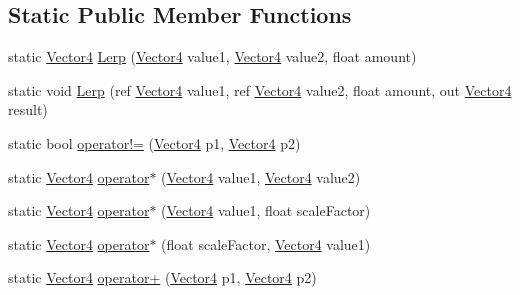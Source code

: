 \subsection*{Static Public Member Functions}
\begin{DoxyCompactItemize}
\item 
static \hyperlink{structMicrosoft_1_1Xna_1_1Framework_1_1Vector4}{Vector4} \hyperlink{structMicrosoft_1_1Xna_1_1Framework_1_1Vector4_a5174b43ecf230828b315f27f7b83b7c8}{Lerp} (\hyperlink{structMicrosoft_1_1Xna_1_1Framework_1_1Vector4}{Vector4} value1, \hyperlink{structMicrosoft_1_1Xna_1_1Framework_1_1Vector4}{Vector4} value2, float amount)
\item 
static void \hyperlink{structMicrosoft_1_1Xna_1_1Framework_1_1Vector4_aca86726116f30561acb59018638637e0}{Lerp} (ref \hyperlink{structMicrosoft_1_1Xna_1_1Framework_1_1Vector4}{Vector4} value1, ref \hyperlink{structMicrosoft_1_1Xna_1_1Framework_1_1Vector4}{Vector4} value2, float amount, out \hyperlink{structMicrosoft_1_1Xna_1_1Framework_1_1Vector4}{Vector4} result)
\item 
static bool \hyperlink{structMicrosoft_1_1Xna_1_1Framework_1_1Vector4_a3235b5ff1b77b7cbb86deee418297c56}{operator!=} (\hyperlink{structMicrosoft_1_1Xna_1_1Framework_1_1Vector4}{Vector4} p1, \hyperlink{structMicrosoft_1_1Xna_1_1Framework_1_1Vector4}{Vector4} p2)
\item 
static \hyperlink{structMicrosoft_1_1Xna_1_1Framework_1_1Vector4}{Vector4} \hyperlink{structMicrosoft_1_1Xna_1_1Framework_1_1Vector4_afb060547b83bbc6d185585e325144630}{operator$\ast$} (\hyperlink{structMicrosoft_1_1Xna_1_1Framework_1_1Vector4}{Vector4} value1, \hyperlink{structMicrosoft_1_1Xna_1_1Framework_1_1Vector4}{Vector4} value2)
\item 
static \hyperlink{structMicrosoft_1_1Xna_1_1Framework_1_1Vector4}{Vector4} \hyperlink{structMicrosoft_1_1Xna_1_1Framework_1_1Vector4_a8de09aa14e7a45f2031a4149f87f7a85}{operator$\ast$} (\hyperlink{structMicrosoft_1_1Xna_1_1Framework_1_1Vector4}{Vector4} value1, float scale\+Factor)
\item 
static \hyperlink{structMicrosoft_1_1Xna_1_1Framework_1_1Vector4}{Vector4} \hyperlink{structMicrosoft_1_1Xna_1_1Framework_1_1Vector4_a3dac00c50777d59c9393e09403e27a96}{operator$\ast$} (float scale\+Factor, \hyperlink{structMicrosoft_1_1Xna_1_1Framework_1_1Vector4}{Vector4} value1)
\item 
static \hyperlink{structMicrosoft_1_1Xna_1_1Framework_1_1Vector4}{Vector4} \hyperlink{structMicrosoft_1_1Xna_1_1Framework_1_1Vector4_a63ba999a918e08a40fd59212fdc0c954}{operator+} (\hyperlink{structMicrosoft_1_1Xna_1_1Framework_1_1Vector4}{Vector4} p1, \hyperlink{structMicrosoft_1_1Xna_1_1Framework_1_1Vector4}{Vector4} p2)

\end{DoxyCompactItemize}
